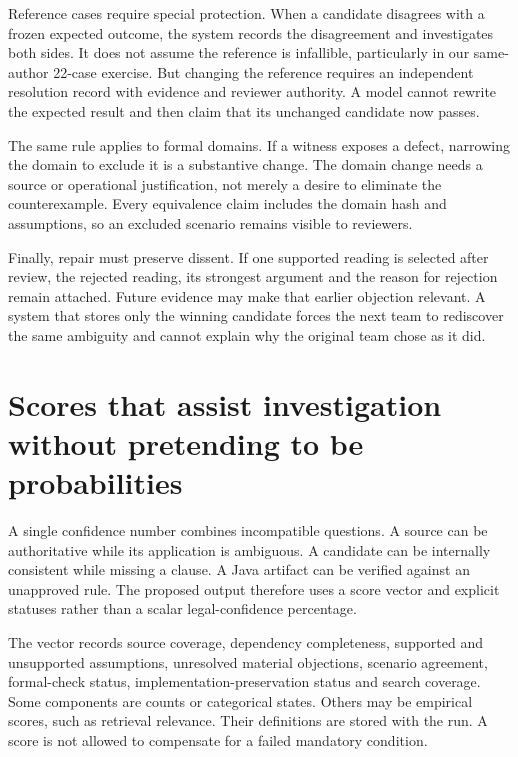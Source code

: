 
Reference cases require special protection. When a candidate disagrees with a
frozen expected outcome, the system records the disagreement and investigates
both sides. It does not assume the reference is infallible, particularly in our
same-author 22-case exercise. But changing the reference requires an independent
resolution record with evidence and reviewer authority. A model cannot rewrite
the expected result and then claim that its unchanged candidate now passes.

The same rule applies to formal domains. If a witness exposes a defect, narrowing
the domain to exclude it is a substantive change. The domain change needs a
source or operational justification, not merely a desire to eliminate the
counterexample. Every equivalence claim includes the domain hash and assumptions,
so an excluded scenario remains visible to reviewers.

Finally, repair must preserve dissent. If one supported reading is selected after
review, the rejected reading, its strongest argument and the reason for rejection
remain attached. Future evidence may make that earlier objection relevant. A
system that stores only the winning candidate forces the next team to rediscover
the same ambiguity and cannot explain why the original team chose as it did.

\section{Scores that assist investigation without pretending to be probabilities}
\label{merge:M06:19}


A single confidence number combines incompatible questions. A source can be
authoritative while its application is ambiguous. A candidate can be internally
consistent while missing a clause. A Java artifact can be verified against an
unapproved rule. The proposed output therefore uses a score vector and explicit
statuses rather than a scalar legal-confidence percentage.

The vector records source coverage, dependency completeness, supported and
unsupported assumptions, unresolved material objections, scenario agreement,
formal-check status, implementation-preservation status and search coverage.
Some components are counts or categorical states. Others may be empirical
scores, such as retrieval relevance. Their definitions are stored with the run.
A score is not allowed to compensate for a failed mandatory condition.

